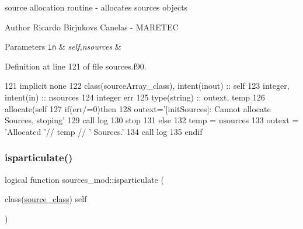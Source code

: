 source allocation routine -\/ allocates sources objects 

\begin{DoxyAuthor}{Author}
Ricardo Birjukovs Canelas -\/ M\+A\+R\+E\+T\+EC 
\end{DoxyAuthor}

\begin{DoxyParams}[1]{Parameters}
\mbox{\tt in}  & {\em self,nsources} & \\
\hline
\end{DoxyParams}


Definition at line 121 of file sources.\+f90.


\begin{DoxyCode}
121     \textcolor{keywordtype}{implicit none}
122     \textcolor{keywordtype}{class}(sourceArray\_class), \textcolor{keywordtype}{intent(inout)} :: self
123     \textcolor{keywordtype}{integer}, \textcolor{keywordtype}{intent(in)} :: nsources
124     \textcolor{keywordtype}{integer} err
125     \textcolor{keywordtype}{type}(string) :: outext, temp
126     \textcolor{keyword}{allocate}(self%
127     \textcolor{keywordflow}{if}(err/=0)\textcolor{keywordflow}{then}
128         outext=\textcolor{stringliteral}{'[initSources]: Cannot allocate Sources, stoping'}
129         \textcolor{keyword}{call }log%
130         stop
131     \textcolor{keywordflow}{else}
132         temp = nsources
133         outext = \textcolor{stringliteral}{'Allocated '}// temp // \textcolor{stringliteral}{' Sources.'}
134         \textcolor{keyword}{call }log%
135 \textcolor{keywordflow}{    endif}
\end{DoxyCode}
\mbox{\label{namespacesources__mod_ac4e4f33da78d030e1b56a48789da6a05}} 
\subsubsection{\texorpdfstring{isparticulate()}{isparticulate()}}
{\footnotesize\ttfamily logical function sources\+\_\+mod\+::isparticulate (\begin{DoxyParamCaption}\item[{class(\mbox{\hyperlink{structsources__mod_1_1source__class}{source\+\_\+class}})}]{self }\end{DoxyParamCaption})\hspace{0.3cm}{\ttfamily [private]}}



